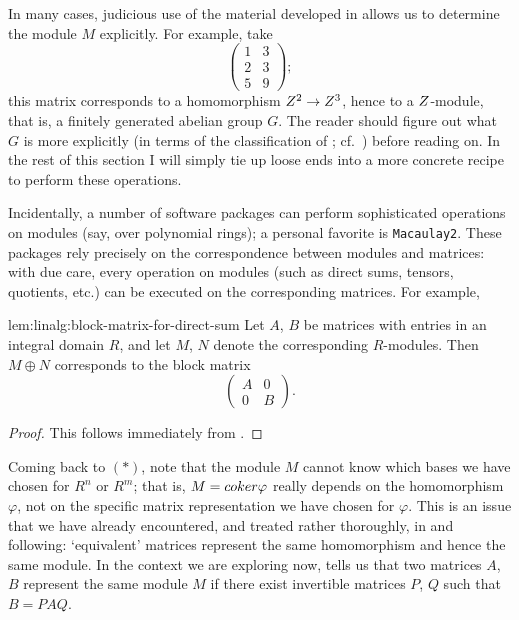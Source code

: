 In many cases, judicious use of the material developed in
 allows us to
determine the module $M$ explicitly. For example, take
\[
  \begin{pmatrix} 1 & 3 \\ 2 & 3 \\ 5 & 9 \end{pmatrix};
\]
this matrix corresponds to a homomorphism $Z^2 \to Z^3$, hence to a
$Z$-module, that is, a finitely generated abelian group $G$. The
reader should figure out what $G$ is more explicitly (in terms of the
classification of ; cf.\
)
before reading on. In the rest of this section I will simply tie up
loose ends into a more concrete recipe to perform these operations.

Incidentally, a number of software packages can perform sophisticated
operations on modules (say, over polynomial rings); a personal
favorite is \texttt{Macaulay2}. These packages rely precisely on the
correspondence between modules and matrices: with due care, every
operation on modules (such as direct sums, tensors, quotients, etc.)
can be executed on the corresponding matrices. For example,
\begin{lem}{}{lem:linalg:block-matrix-for-direct-sum}
  Let $A$, $B$ be matrices with entries in an integral domain $R$, and
  let $M$, $N$ denote the corresponding $R$-modules. Then $M \oplus N$
  corresponds to the block matrix
  \[
    \left(
      \begin{array}{c|c}
        A & 0 \\
        \hline
        0 & B
      \end{array}
    \right).
  \]
\end{lem}
\begin{proof}
  This follows immediately from
  .
\end{proof}

Coming back to $(*)$, note that the module $M$ cannot know which bases
we have chosen for $R^n$ or $R^m$; that is, $M = coker\varphi$ really
depends on the homomorphism $\varphi$, not on the specific matrix
representation we have chosen for $\varphi$. This is an issue that we
have already encountered, and treated rather thoroughly, in
 and following: `equivalent'
matrices represent the same homomorphism and hence the same module. In
the context we are exploring now,  tells us that two
matrices $A$, $B$ represent the same module $M$ if there exist
invertible matrices $P$, $Q$ such that $B = PAQ$.

